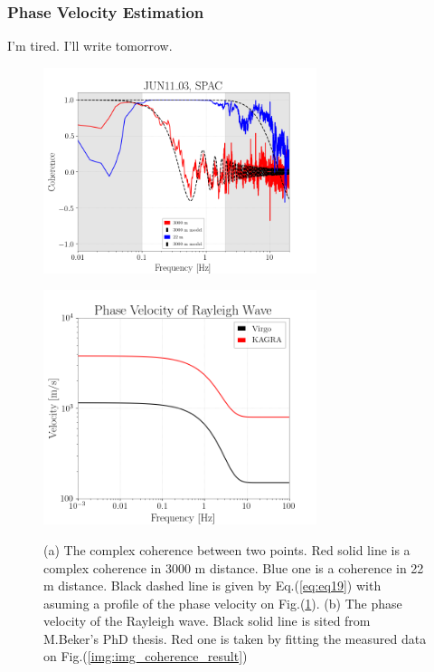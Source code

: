 \documentclass[a4paper,12pt]{book}
\begin{document}
\subsubsection{Phase Velocity Estimation}
I'm tired. I'll write tomorrow.
\begin{figure}[H] 
 \begin{minipage}{0.5\hsize}
  \begin{center}
    \includegraphics[width=8.0cm]{./img_coherence_result.png}    
  \end{center}
  \subcaption{}  
  \label{img:img_coherence_result}
 \end{minipage}
 \begin{minipage}{0.5\hsize}
  \begin{center}
    \includegraphics[width=8.0cm]{./img_RwaveVelocity.png}    
  \end{center}
  \subcaption{}
  \label{img:img_RwaveVelocity}  
 \end{minipage}
  \caption{(a) The complex coherence between two points. Red solid line is a complex coherence in 3000 m distance. Blue one is a coherence in 22 m distance. Black dashed line is given by Eq.(\ref{eq:eq19}) with asuming a profile of the phase velocity on Fig.(\ref{img:img_RwaveVelocity}). (b) The phase velocity of the Rayleigh wave. Black solid line is sited from M.Beker's PhD thesis. Red one is taken by fitting the measured data on Fig.(\ref{img:img_coherence_result})} 
\end{figure}
\end{document}
